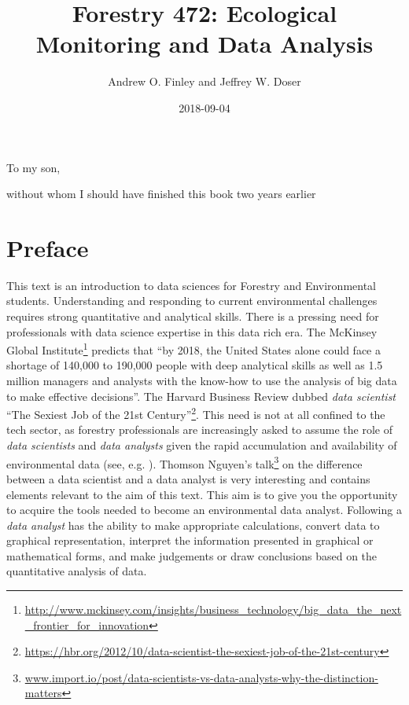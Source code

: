 \documentclass[]{krantz}
\title{Forestry 472: Ecological Monitoring and Data Analysis}
\author{Andrew O. Finley and Jeffrey W. Doser}
\date{2018-09-04}
\renewcommand{\href}[2]{#2\footnote{\url{#1}}}
\theoremstyle{definition}
\theoremstyle{definition}
\theoremstyle{definition}
\theoremstyle{remark}
\begin{document}
\maketitle


\thispagestyle{empty}

\begin{center}
To my son,

without whom I should have finished this book two years earlier
\end{center}

\setlength{\abovedisplayskip}{-5pt}
\setlength{\abovedisplayshortskip}{-5pt}

{
\hypersetup{linkcolor=black}
\setcounter{tocdepth}{2}
\tableofcontents
}
\listoftables
\listoffigures
\chapter*{Preface}\label{preface}


This text is an introduction to data sciences for Forestry and
Environmental students. Understanding and responding to current
environmental challenges requires strong quantitative and analytical
skills. There is a pressing need for professionals with data science
expertise in this data rich era. The
\href{http://www.mckinsey.com/insights/business_technology/big_data_the_next_frontier_for_innovation}{McKinsey
Global Institute} predicts that ``by 2018, the United States alone could
face a shortage of 140,000 to 190,000 people with deep analytical skills
as well as 1.5 million managers and analysts with the know-how to use
the analysis of big data to make effective decisions''. The Harvard
Business Review dubbed \emph{data scientist}
\href{https://hbr.org/2012/10/data-scientist-the-sexiest-job-of-the-21st-century}{``The
Sexiest Job of the 21st Century''}. This need is not at all confined to
the tech sector, as forestry professionals are increasingly asked to
assume the role of \emph{data scientists} and \emph{data analysts} given
the rapid accumulation and availability of environmental data (see, e.g.
\citet{Schimel2015}).
\href{www.import.io/post/data-scientists-vs-data-analysts-why-the-distinction-matters}{Thomson
Nguyen's talk} on the difference between a data scientist and a data
analyst is very interesting and contains elements relevant to the aim of
this text. This aim is to give you the opportunity to acquire the tools
needed to become an environmental data analyst. Following
\citet{Bravo16} a \emph{data analyst} has the ability to make
appropriate calculations, convert data to graphical representation,
interpret the information presented in graphical or mathematical forms,
and make judgements or draw conclusions based on the quantitative
analysis of data.
\end{document}
